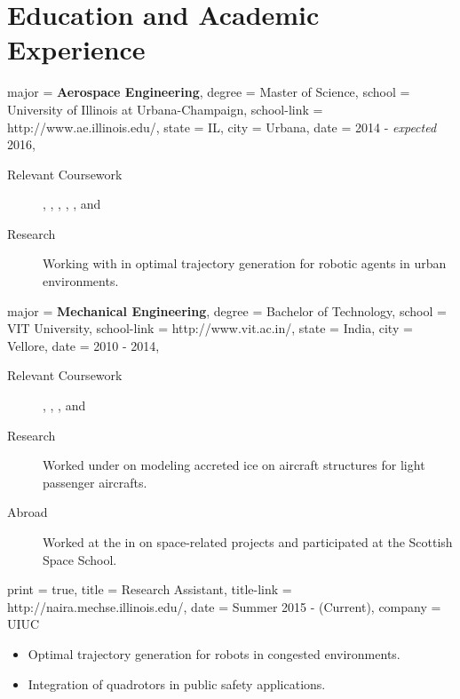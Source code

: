 \documentclass{simplecv}
\begin{document}
\section{Education and Academic Experience}
\begin{education}
  {
      major = \textbf{Aerospace Engineering},
      degree = Master of Science,
      school = University of Illinois at Urbana-Champaign,
      school-link = http://www.ae.illinois.edu/,
      state = IL,
      city = Urbana,
      date = 2014 - \textit{expected} 2016,
  }

\begin{description}
    \item[Relevant Coursework]
        ,
    ,
    ,
    ,
    ,
    and 
\item[Research] Working with  in optimal trajectory generation for robotic agents in urban environments.

\end{description}
\end{education}
\begin{education}
  {
      major = \textbf{Mechanical Engineering},
      degree = Bachelor of Technology,
      school = VIT University,
      school-link = http://www.vit.ac.in/,
      state = India,
      city = Vellore,
      date = 2010 - 2014,
  }

\begin{description}
    \item[Relevant Coursework]
    ,
    ,
    ,
    and
\item[Research] Worked under  on modeling accreted ice on aircraft structures for light passenger aircrafts.
\item[Abroad]
    Worked at the \href{http://www.stratch.ac.uk/engineering}{} in  on space-related projects and participated at the Scottish Space School. 
\end{description}
\end{education}

\begin{position}
  {
      print   = true,
      title   = Research Assistant,
      title-link = http://naira.mechse.illinois.edu/,
      date    = Summer 2015 - (Current),
      company = UIUC
  }

  \begin{itemize}
      \item Optimal trajectory generation for robots in congested environments.
      \item Integration of quadrotors in public safety applications.
  \end{itemize}
\end{position}
\end{document}
